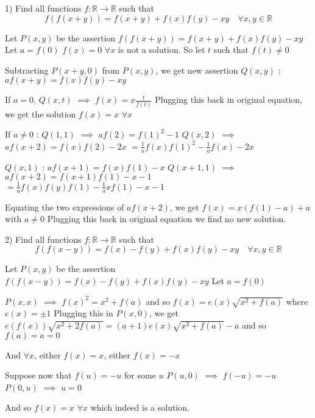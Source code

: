 \begin{solution}
	\begin{tcolorbox}1) Find all  functions $f:\mathbb{R}\to\mathbb{R}$ such that
\[f(f(x+y))=f(x+y)+f(x)f(y)-xy  \quad \forall x,y\in\mathbb{R}\]\end{tcolorbox}
Let $P(x,y)$ be the assertion $f(f(x+y))=f(x+y)+f(x)f(y)-xy$
Let $a=f(0)$
$f(x)=0$ $\forall x$ is not a solution. So let $t$ such that $f(t)\ne 0$

Subtracting $P(x+y,0)$ from $P(x,y)$, we get new assertion $Q(x,y)$ : $af(x+y)=f(x)f(y)-xy$

If $a=0$, $Q(x,t)$ $\implies$ $f(x)=x\frac t{f(t)}$
Plugging this back in original equation, we get the solution $\boxed{f(x)=x}$ $\forall x$

If $a\ne 0$ :
$Q(1,1)$ $\implies$ $af(2)=f(1)^2-1$
$Q(x,2)$ $\implies$ $af(x+2)=f(x)f(2)-2x$ $=\frac 1af(x)f(1)^2-\frac 1af(x)-2x$

$Q(x,1)$ : $af(x+1)=f(x)f(1)-x$
$Q(x+1,1)$ $\implies$ $af(x+2)=f(x+1)f(1)-x-1$ $=\frac 1af(x)f(y)f(1)-\frac 1axf(1)-x-1$

Equating the two expressions of $af(x+2)$, we get $f(x)=x(f(1)-a)+a$ with $a\ne 0$
Plugging this back in original equation we find no new solution.
\end{solution}



\begin{solution}
	\begin{tcolorbox}2) Find all functions $f:\mathbb{R}\to\mathbb{R}$ such that
\[f(f(x-y))=f(x)-f(y)+f(x)f(y)-xy  \quad \forall x,y\in\mathbb{R}\]\end{tcolorbox}
Let $P(x,y)$ be the assertion $f(f(x-y))=f(x)-f(y)+f(x)f(y)-xy$
Let $a=f(0)$

$P(x,x)$ $\implies$ $f(x)^2=x^2+f(a)$ and so $f(x)=e(x)\sqrt{x^2+f(a)}$ where $e(x)=\pm 1$
Plugging this in $P(x,0)$, we get $e(f(x))\sqrt{x^2+2f(a)}=(a+1)e(x)\sqrt{x^2+f(a)}-a$ and so $f(a)=a=0$

And $\forall x$, either $f(x)=x$, either $f(x)=-x$

Suppose now that $f(u)=-u$ for some $u$
$P(u,0)$ $\implies$ $f(-u)=-u$
$P(0,u)$ $\implies$ $u=0$

And so $\boxed{f(x)=x}$ $\forall x$ which indeed is a solution.
\end{solution}



